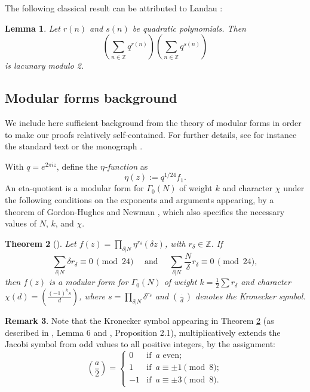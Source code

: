 \documentclass[12pt]{amsart}
\newtheorem{theorem}{Theorem}%
\newtheorem{lemma}[theorem]{Lemma}
\theoremstyle{definition}
\newtheorem{remark}[theorem]{Remark}
\begin{document}
The following classical result can be attributed to Landau \cite{Landau}:
\begin{lemma}\label{laclemma} Let $r(n)$ and $s(n)$ be quadratic polynomials.  Then $$\left( \sum_{n \in \mathbb{Z}} q^{r(n)} \right) \left( \sum_{n \in \mathbb{Z}} q^{s(n)} \right)$$ \noindent is lacunary modulo 2.
\end{lemma}

\subsection{Modular forms background}

We include here sufficient background from the theory of modular forms in order to make our proofs relatively self-contained.  For further details, see for instance the standard text \cite{Koblitz} or the monograph \cite{Ono}.

With $q = e^{2 \pi i z}$, define the \emph{$\eta$-function} as $$\eta(z) :=  q^{1/24} f_1.$$  An eta-quotient is a {modular form} for $\Gamma_0(N)$ of weight $k$ and character $\chi$ under the following conditions on the exponents and arguments appearing, by a theorem of Gordon-Hughes \cite{GH} and Newman \cite{Newman}, which also specifies the necessary values of $N$, $k$, and $\chi$.
\begin{theorem} [\cite{GH,Newman}]\label{ghn} Let $f(z) = \prod_{\delta \vert N} \eta^{r_\delta} (\delta z)$, with $r_\delta \in \mathbb{Z}$.  If
$$\sum_{\delta \vert N} \delta r_\delta \equiv 0 \, \pmod{24} \quad \text{ and } \quad \sum_{\delta \vert N} \frac{N}{\delta} r_\delta \equiv 0 \, \pmod{24},$$
then $f(z)$ is a modular form for $\Gamma_0(N)$ of weight $k=\frac{1}{2} \sum r_\delta$ and character $\chi(d) = \left( \frac{(-1)^k s}{d} \right)$, where $s = \prod_{\delta \vert N} \delta^{r_\delta}$ and $\left(\frac{\cdot}{d}\right)$ denotes the Kronecker symbol.
\end{theorem}

\begin{remark} Note that the Kronecker symbol appearing in Theorem \ref{ghn} (as described in \cite{OnoKronecker}, Lemma 6 and \cite{XiongKronecker}, Proposition 2.1), multiplicatively extends the Jacobi symbol from odd values to all positive integers, by the assignment:
 \begin{equation}
    \left( \frac{a}{2} \right) =
    \begin{cases}
      0 & \text{if } \, a \text{ even}; \\
      1 & \text{if } \, a \equiv \pm 1\pmod{8}; \\
      -1 & \text{if } \, a \equiv \pm 3\pmod{8}.
    \end{cases}
  \end{equation}
\end{remark}
\end{document}
